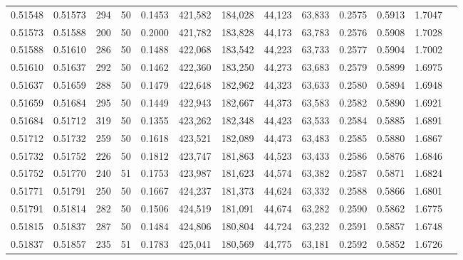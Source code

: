 \begin{tabular}{rrrrrrrrrrrrr}
0.51548 & 0.51573 &   294 &  50 &                                     0.1453 & 421,582 & 184,028 &  44,123 &  63,833 & 0.2575 & 0.5913 & 1.7047 \\
0.51573 & 0.51588 &   200 &  50 &                                     0.2000 & 421,782 & 183,828 &  44,173 &  63,783 & 0.2576 & 0.5908 & 1.7028 \\
0.51588 & 0.51610 &   286 &  50 &                                     0.1488 & 422,068 & 183,542 &  44,223 &  63,733 & 0.2577 & 0.5904 & 1.7002 \\
0.51610 & 0.51637 &   292 &  50 &                                     0.1462 & 422,360 & 183,250 &  44,273 &  63,683 & 0.2579 & 0.5899 & 1.6975 \\
0.51637 & 0.51659 &   288 &  50 &                                     0.1479 & 422,648 & 182,962 &  44,323 &  63,633 & 0.2580 & 0.5894 & 1.6948 \\
0.51659 & 0.51684 &   295 &  50 &                                     0.1449 & 422,943 & 182,667 &  44,373 &  63,583 & 0.2582 & 0.5890 & 1.6921 \\
0.51684 & 0.51712 &   319 &  50 &                                     0.1355 & 423,262 & 182,348 &  44,423 &  63,533 & 0.2584 & 0.5885 & 1.6891 \\
0.51712 & 0.51732 &   259 &  50 &                                     0.1618 & 423,521 & 182,089 &  44,473 &  63,483 & 0.2585 & 0.5880 & 1.6867 \\
0.51732 & 0.51752 &   226 &  50 &                                     0.1812 & 423,747 & 181,863 &  44,523 &  63,433 & 0.2586 & 0.5876 & 1.6846 \\
0.51752 & 0.51770 &   240 &  51 &                                     0.1753 & 423,987 & 181,623 &  44,574 &  63,382 & 0.2587 & 0.5871 & 1.6824 \\
0.51771 & 0.51791 &   250 &  50 &                                     0.1667 & 424,237 & 181,373 &  44,624 &  63,332 & 0.2588 & 0.5866 & 1.6801 \\
0.51791 & 0.51814 &   282 &  50 &                                     0.1506 & 424,519 & 181,091 &  44,674 &  63,282 & 0.2590 & 0.5862 & 1.6775 \\
0.51815 & 0.51837 &   287 &  50 &                                     0.1484 & 424,806 & 180,804 &  44,724 &  63,232 & 0.2591 & 0.5857 & 1.6748 \\
0.51837 & 0.51857 &   235 &  51 &                                     0.1783 & 425,041 & 180,569 &  44,775 &  63,181 & 0.2592 & 0.5852 & 1.6726 \\

\end{tabular}
